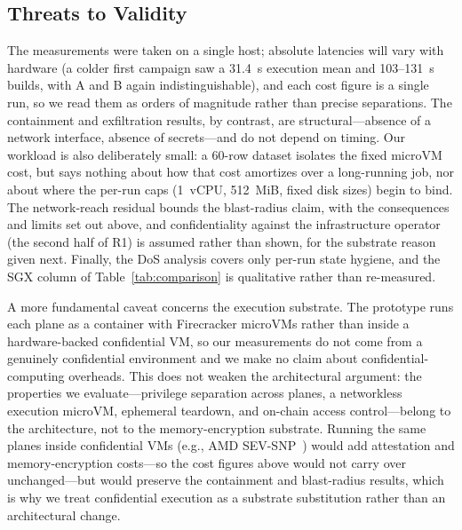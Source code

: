 \subsection{Threats to Validity}

The measurements were taken on a single host; absolute latencies will vary with hardware (a
colder first campaign saw a 31.4~s execution mean and 103--131~s builds, with A and B again
indistinguishable), and each cost figure is a single run, so we read them as orders of
magnitude rather than precise separations. The containment and exfiltration results, by
contrast, are structural---absence of a network interface, absence of secrets---and do not
depend on timing. Our workload is also deliberately small: a 60-row dataset isolates the
fixed microVM cost, but says nothing about how that cost amortizes over a long-running job,
nor about where the per-run caps (1~vCPU, 512~MiB, fixed disk sizes) begin to bind. The
network-reach residual bounds the blast-radius claim, with the consequences and limits set
out above, and confidentiality against the infrastructure operator (the second half of R1)
is assumed rather than shown, for the substrate reason given next. Finally, the DoS analysis
covers only per-run state hygiene, and the SGX column of Table~\ref{tab:comparison} is
qualitative rather than re-measured.

A more fundamental caveat concerns the execution substrate. The prototype runs each plane as
a container with Firecracker microVMs rather than inside a hardware-backed confidential VM,
so our measurements do not come from a genuinely confidential environment and we make no
claim about confidential-computing overheads. This does not weaken the architectural
argument: the properties we evaluate---privilege separation across planes, a networkless
execution microVM, ephemeral teardown, and on-chain access control---belong to the
architecture, not to the memory-encryption substrate. Running the same planes inside
confidential VMs (e.g., AMD SEV-SNP~\cite{amd2020sevsnp}) would add attestation and
memory-encryption costs---so the cost figures above would not carry over unchanged---but
would preserve the containment and blast-radius results, which is why we treat confidential
execution as a substrate substitution rather than an architectural change.

